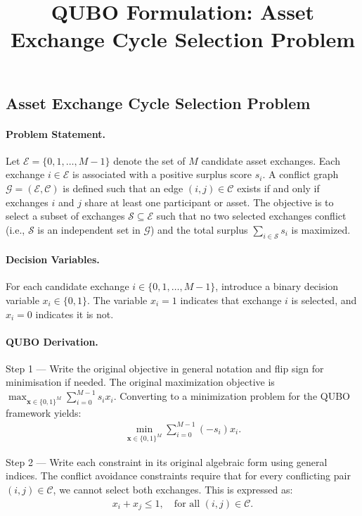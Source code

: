 \documentclass[12pt]{article}
\title{QUBO Formulation: Asset Exchange Cycle Selection Problem}
\date{}
\begin{document}
\maketitle

\subsection*{Asset Exchange Cycle Selection Problem}

\paragraph{Problem Statement.}
Let $\mathcal{E} = \{0, 1, \dots, M-1\}$ denote the set of $M$ candidate asset exchanges. Each exchange $i \in \mathcal{E}$ is associated with a positive surplus score $s_i$. A conflict graph $\mathcal{G} = (\mathcal{E}, \mathcal{C})$ is defined such that an edge $(i,j) \in \mathcal{C}$ exists if and only if exchanges $i$ and $j$ share at least one participant or asset. The objective is to select a subset of exchanges $\mathcal{S} \subseteq \mathcal{E}$ such that no two selected exchanges conflict (i.e., $\mathcal{S}$ is an independent set in $\mathcal{G}$) and the total surplus $\sum_{i \in \mathcal{S}} s_i$ is maximized.

\paragraph{Decision Variables.}
For each candidate exchange $i \in \{0, 1, \dots, M-1\}$, introduce a binary decision variable $x_i \in \{0, 1\}$. The variable $x_i = 1$ indicates that exchange $i$ is selected, and $x_i = 0$ indicates it is not.

\paragraph{QUBO Derivation.}
Step 1 --- Write the original objective in general notation and flip sign for minimisation if needed.
The original maximization objective is $\max_{\mathbf{x} \in \{0,1\}^M} \sum_{i=0}^{M-1} s_i x_i$. Converting to a minimization problem for the QUBO framework yields:
\begin{align}
\min_{\mathbf{x} \in \{0,1\}^M} \sum_{i=0}^{M-1} (-s_i) x_i.
\end{align}

Step 2 --- Write each constraint in its original algebraic form using general indices.
The conflict avoidance constraints require that for every conflicting pair $(i,j) \in \mathcal{C}$, we cannot select both exchanges. This is expressed as:
\begin{align}
x_i + x_j \le 1, \quad \text{for all } (i,j) \in \mathcal{C}.
\end{align}
\end{document}
